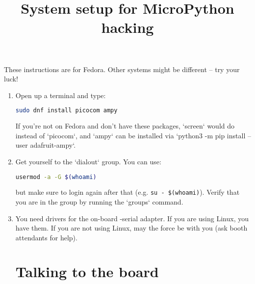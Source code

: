 \documentclass{../tutorial}
\title{System setup for MicroPython \abbr{ESP32} hacking}
\begin{document}
These instructions are for Fedora.
Other systems might be different – try your luck!

\begin{enumerate}

\section{Installation}

\item
    Open up a terminal and type:

    \begin{lstlisting}[language=bash]
    sudo dnf install picocom ampy
    \end{lstlisting}

    If you're not on Fedora and don't have these packages,
    `screen` would do instead of `picocom`,
    and `ampy` can be installed via
    `python3 -m pip install --user adafruit-ampy`.

\item
    Get yourself to the `dialout` group.
    You can use:

    \begin{lstlisting}[language=bash]
    usermod -a -G $(whoami)
    \end{lstlisting}

    but make sure to login again after that
    (e.g. \lstinline|su - $(whoami)|).
    Verify that you are in the group by running the `groups` command.

    \begin{comment}
        The `dialout` group is historically designed for modems
        and gives you full and direct access to serial ports.
    \end{comment}

\item
    You need drivers for the on-board  -serial adapter.
    If you are using Linux, you have them.
    If you are not using Linux, may the force be with you
    (ask booth attendants for help).

\section{Talking to the board}

    \begin{comment}
        To protect delicate pins and make connections easier,
        the black \abbr{ESP32} devkit is plugged into a white OctopusLab Robot~Board.
        Please ask if you want to unplug it.
    \end{comment}


\end{enumerate}
\end{document}
